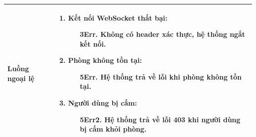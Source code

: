 {\begin{tabularx}{\textwidth}{|>{\raggedright\arraybackslash}p{3.5cm}|>{\raggedright\arraybackslash}X|}
\hline
\textbf{Luồng ngoại lệ} &
\begin{enumerate}
    \item \textbf{Kết nối WebSocket thất bại:}
    \begin{enumerate}
        \item[3Err.] Không có header xác thực, hệ thống ngắt kết nối.
    \end{enumerate}
    \item \textbf{Phòng không tồn tại:}
    \begin{enumerate}
        \item[5Err.] Hệ thống trả về lỗi khi phòng không tồn tại.
    \end{enumerate}
    \item \textbf{Người dùng bị cấm:}
    \begin{enumerate}
        \item[5Err2.] Hệ thống trả về lỗi 403 khi người dùng bị cấm khỏi phòng.
    \end{enumerate}
\end{enumerate} \\
\hline
\end{tabularx}
}
